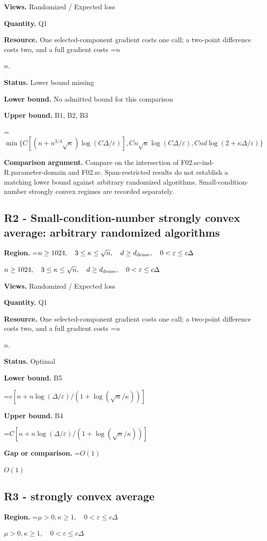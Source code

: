 \documentclass[10pt,a4paper]{article}
\newcommand{\AtlasMath}[1]{\par\begingroup\centering\setbox0=\hbox{$\displaystyle #1$}\ifdim\wd0>1.4\linewidth\typeout{ATLAS WIDE FORMULA: \the\wd0}\fi\ifdim\wd0>\linewidth\resizebox{\linewidth}{!}{\box0}\else\box0\fi\par\endgroup}
\newcommand{\AtlasInlineMath}[1]{\begingroup\setbox0=\hbox{$#1$}\ifdim\wd0>.4\linewidth\endgroup\AtlasMath{#1}\else\endgroup$#1$\fi}
\begin{document}
\textbf{Views.} Randomized / Expected loss

\textbf{Quantity.} Q1

\textbf{Resource.} One selected-component gradient costs one call; a two-point difference costs two, and a full gradient costs \AtlasInlineMath{n}.

\textbf{Status.} Lower bound missing

\textbf{Lower bound.} No admitted bound for this comparison

\textbf{Upper bound.} B1, B2, B3

\AtlasMath{\min\{C[(n+n^{3/4}\sqrt\kappa)\log(C\Delta/\varepsilon)],Cn\sqrt\kappa\log(C\Delta/\varepsilon),Cnd\log(2+\kappa\Delta/\varepsilon)\}}
\textbf{Comparison argument.} Compare on the intersection of F02.sc-ind-R.parameter-domain and F02.sc. Span-restricted results do not establish a matching lower bound against arbitrary randomized algorithms. Small-condition-number strongly convex regimes are recorded separately.

\subsection{R2 - Small-condition-number strongly convex average: arbitrary randomized algorithms}
\textbf{Region.} \AtlasInlineMath{n\ge1024,\quad3\le\kappa\le\sqrt n,\quad d\ge d_{\rm dense},\quad0<\varepsilon\le c\Delta}

\textbf{Views.} Randomized / Expected loss

\textbf{Quantity.} Q1

\textbf{Resource.} One selected-component gradient costs one call; a two-point difference costs two, and a full gradient costs \AtlasInlineMath{n}.

\textbf{Status.} Optimal

\textbf{Lower bound.} B5

\AtlasMath{c[n+n\log(\Delta/\varepsilon)/(1+\log(\sqrt n/\kappa))]}
\textbf{Upper bound.} B4

\AtlasMath{C[n+n\log(\Delta/\varepsilon)/(1+\log(\sqrt n/\kappa))]}
\textbf{Gap or comparison.} \AtlasInlineMath{O(1)}

\subsection{R3 - strongly convex average}
\textbf{Region.} \AtlasInlineMath{\mu>0,\kappa\ge1,\quad0<\varepsilon\le c\Delta}
\end{document}
